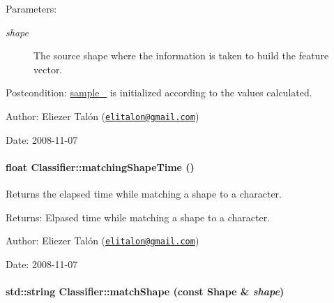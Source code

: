 \begin{Desc}
\item[Parameters:]
\begin{description}
\item[{\em shape}]The source shape where the information is taken to build the feature vector.\end{description}
\end{Desc}
\begin{Desc}
\item[Postcondition:]\hyperlink{class_classifier_3d46e3d6546304f24db6d9402375988a}{sample\_\-} is initialized according to the values calculated.\end{Desc}
\begin{Desc}
\item[Author:]Eliezer Talón (\href{mailto:elitalon@gmail.com}{\tt elitalon@gmail.com}) \end{Desc}
\begin{Desc}
\item[Date:]2008-11-07 \end{Desc}
\hypertarget{class_classifier_82e313296065218b1a01b5e44daa4c2f}{
\paragraph[{matchingShapeTime}]{\setlength{\rightskip}{0pt plus 5cm}float Classifier::matchingShapeTime ()}\hfill}
\label{class_classifier_82e313296065218b1a01b5e44daa4c2f}


Returns the elapsed time while matching a shape to a character. 

\begin{Desc}
\item[Returns:]Elpased time while matching a shape to a character.\end{Desc}
\begin{Desc}
\item[Author:]Eliezer Talón (\href{mailto:elitalon@gmail.com}{\tt elitalon@gmail.com}) \end{Desc}
\begin{Desc}
\item[Date:]2008-11-07 \end{Desc}
\hypertarget{class_classifier_6fd6a8332d3188ac605ff452ab6dc9c2}{
\paragraph[{matchShape}]{\setlength{\rightskip}{0pt plus 5cm}std::string Classifier::matchShape (const {\bf Shape} \& {\em shape})}\hfill}
\label{class_classifier_6fd6a8332d3188ac605ff452ab6dc9c2}


